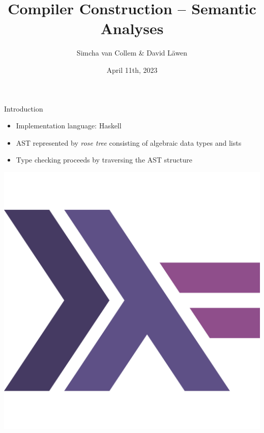 \documentclass[dvipsnames,aspectratio=169]{beamer}
\title[Compiler Construction -- Phase 2]%
{Compiler Construction -- Semantic Analyses}
\subtitle
{}
\author%
{Simcha van Collem \& David Läwen}
\institute[]%
{MFoCS Seminar}
\date[April 11th, 2023] %
{April 11th, 2023}
\begin{document}
\begin{frame}
  \titlepage
\end{frame}

\begin{frame}{Introduction}

  \begin{minipage}{.6\textwidth}

    \begin{itemize}
      \item Implementation language: Haskell
      \item AST represented by \emph{rose tree} consisting of algebraic data
            types and lists
      \item Type checking proceeds by traversing the AST structure
    \end{itemize}

  \end{minipage}\hfill
  \begin{minipage}{.3\textwidth}
    \includegraphics[scale=.17]{assets/haskell-icon.pdf}
  \end{minipage}

\end{frame}
\end{document}
